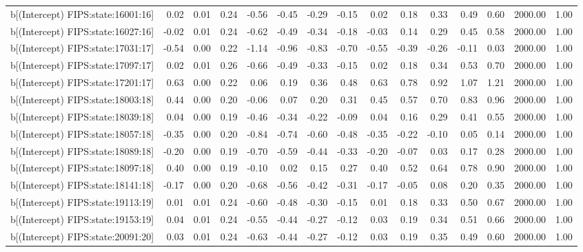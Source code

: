 \begin{table}[ht]
\begin{tabular}{rrrrrrrrrrrrrrr}
  b[(Intercept) FIPS:state:16001:16] & 0.02 & 0.01 & 0.24 & -0.56 & -0.45 & -0.29 & -0.15 & 0.02 & 0.18 & 0.33 & 0.49 & 0.60 & 2000.00 & 1.00 \\ 
  b[(Intercept) FIPS:state:16027:16] & -0.02 & 0.01 & 0.24 & -0.62 & -0.49 & -0.34 & -0.18 & -0.03 & 0.14 & 0.29 & 0.45 & 0.58 & 2000.00 & 1.00 \\ 
  b[(Intercept) FIPS:state:17031:17] & -0.54 & 0.00 & 0.22 & -1.14 & -0.96 & -0.83 & -0.70 & -0.55 & -0.39 & -0.26 & -0.11 & 0.03 & 2000.00 & 1.00 \\ 
  b[(Intercept) FIPS:state:17097:17] & 0.02 & 0.01 & 0.26 & -0.66 & -0.49 & -0.33 & -0.15 & 0.02 & 0.18 & 0.34 & 0.53 & 0.70 & 2000.00 & 1.00 \\ 
  b[(Intercept) FIPS:state:17201:17] & 0.63 & 0.00 & 0.22 & 0.06 & 0.19 & 0.36 & 0.48 & 0.63 & 0.78 & 0.92 & 1.07 & 1.21 & 2000.00 & 1.00 \\ 
  b[(Intercept) FIPS:state:18003:18] & 0.44 & 0.00 & 0.20 & -0.06 & 0.07 & 0.20 & 0.31 & 0.45 & 0.57 & 0.70 & 0.83 & 0.96 & 2000.00 & 1.00 \\ 
  b[(Intercept) FIPS:state:18039:18] & 0.04 & 0.00 & 0.19 & -0.46 & -0.34 & -0.22 & -0.09 & 0.04 & 0.16 & 0.29 & 0.41 & 0.55 & 2000.00 & 1.00 \\ 
  b[(Intercept) FIPS:state:18057:18] & -0.35 & 0.00 & 0.20 & -0.84 & -0.74 & -0.60 & -0.48 & -0.35 & -0.22 & -0.10 & 0.05 & 0.14 & 2000.00 & 1.00 \\ 
  b[(Intercept) FIPS:state:18089:18] & -0.20 & 0.00 & 0.19 & -0.70 & -0.59 & -0.44 & -0.33 & -0.20 & -0.07 & 0.03 & 0.17 & 0.28 & 2000.00 & 1.00 \\ 
  b[(Intercept) FIPS:state:18097:18] & 0.40 & 0.00 & 0.19 & -0.10 & 0.02 & 0.15 & 0.27 & 0.40 & 0.52 & 0.64 & 0.78 & 0.90 & 2000.00 & 1.00 \\ 
  b[(Intercept) FIPS:state:18141:18] & -0.17 & 0.00 & 0.20 & -0.68 & -0.56 & -0.42 & -0.31 & -0.17 & -0.05 & 0.08 & 0.20 & 0.35 & 2000.00 & 1.00 \\ 
  b[(Intercept) FIPS:state:19113:19] & 0.01 & 0.01 & 0.24 & -0.60 & -0.48 & -0.30 & -0.15 & 0.01 & 0.18 & 0.33 & 0.50 & 0.67 & 2000.00 & 1.00 \\ 
  b[(Intercept) FIPS:state:19153:19] & 0.04 & 0.01 & 0.24 & -0.55 & -0.44 & -0.27 & -0.12 & 0.03 & 0.19 & 0.34 & 0.51 & 0.66 & 2000.00 & 1.00 \\ 
  b[(Intercept) FIPS:state:20091:20] & 0.03 & 0.01 & 0.24 & -0.63 & -0.44 & -0.27 & -0.12 & 0.03 & 0.19 & 0.35 & 0.49 & 0.60 & 2000.00 & 1.00 \\ 

\end{tabular}
\end{table}
